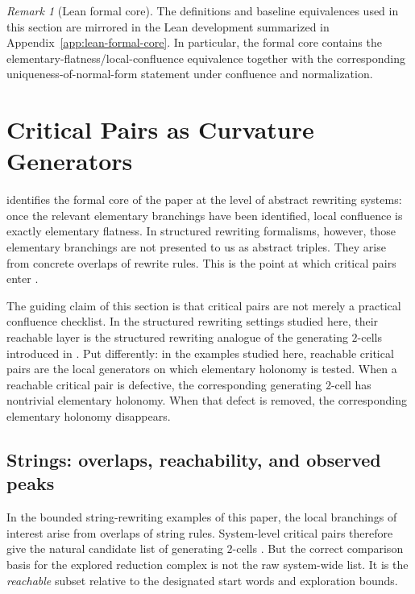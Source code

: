 \documentclass[11pt]{article}
\numberwithin{equation}{section}
\theoremstyle{definition}
\theoremstyle{remark}
\newtheorem{remark}[theorem]{Remark}
\begin{document}
\begin{remark}[Lean formal core]
\label{rem:lean-formal-core-crossref}
The definitions and baseline equivalences used in this section are mirrored in the Lean development summarized in Appendix~\ref{app:lean-formal-core}. In particular, the formal core contains the elementary-flatness/local-confluence equivalence together with the corresponding uniqueness-of-normal-form statement under confluence and normalization.
\end{remark}
 \section{Critical Pairs as Curvature Generators}
\label{sec:critical-pairs-curvature}

 identifies the formal core of the paper at the level of abstract rewriting systems: once the relevant elementary branchings have been identified, local confluence is exactly elementary flatness. In structured rewriting formalisms, however, those elementary branchings are not presented to us as abstract triples. They arise from concrete overlaps of rewrite rules. This is the point at which critical pairs enter \cite{KnuthBendix1970,BaaderNipkow1998,Terese2003}.

The guiding claim of this section is that critical pairs are not merely a practical confluence checklist. In the structured rewriting settings studied here, their reachable layer is the structured rewriting analogue of the generating $2$-cells introduced in  \cite{SquierOtto1987,Squier1987,GuiraudMalbos2018,GuiraudMalbos2012,Mimram2023}. Put differently: in the examples studied here, reachable critical pairs are the local generators on which elementary holonomy is tested. When a reachable critical pair is defective, the corresponding generating $2$-cell has nontrivial elementary holonomy. When that defect is removed, the corresponding elementary holonomy disappears.

\subsection{Strings: overlaps, reachability, and observed peaks}
\label{subsec:string-critical-pairs}

In the bounded string-rewriting examples of this paper, the local branchings of interest arise from overlaps of string rules. System-level critical pairs therefore give the natural candidate list of generating $2$-cells \cite{BonchiEtAl2022}. But the correct comparison basis for the explored reduction complex is not the raw system-wide list. It is the \emph{reachable} subset relative to the designated start words and exploration bounds.
\end{document}
